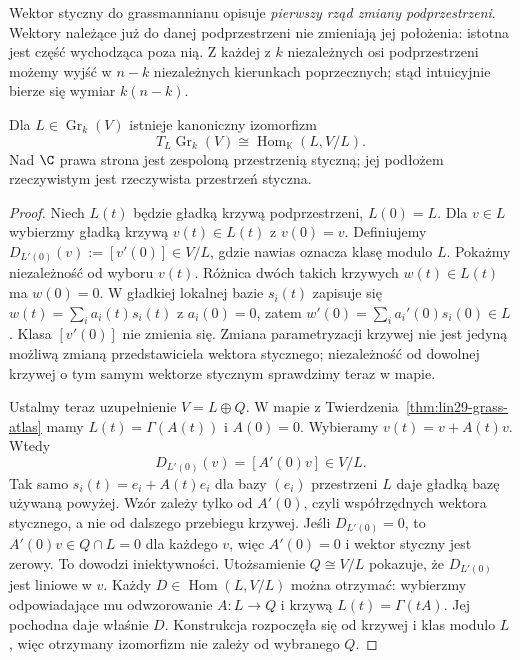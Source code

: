 Wektor styczny do grassmannianu opisuje \emph{pierwszy
rząd zmiany podprzestrzeni}. Wektory należące już do
danej podprzestrzeni nie zmieniają jej położenia:
istotna jest część wychodząca poza nią.
Z każdej z $k$ niezależnych osi podprzestrzeni możemy
wyjść w $n-k$ niezależnych kierunkach poprzecznych;
stąd intuicyjnie bierze się wymiar $k(n-k)$.

\begin{twierdzenie}
\label{thm:lin29-grass-styczna}
Dla $L\in\operatorname{Gr}_k(V)$ istnieje kanoniczny
izomorfizm
\begin{equation}\label{eq:lin29-grass-styczna}
 T_L\operatorname{Gr}_k(V)
  \cong\operatorname{Hom}_{\mathbb K}(L,V/L).
\end{equation}
Nad $\C$ prawa strona jest zespoloną przestrzenią
styczną; jej podłożem rzeczywistym jest rzeczywista
przestrzeń styczna.
\end{twierdzenie}
\begin{proof}
Niech $L(t)$ będzie gładką krzywą podprzestrzeni,
$L(0)=L$. Dla $v\in L$ wybierzmy gładką krzywą
$v(t)\in L(t)$ z $v(0)=v$. Definiujemy
$D_{L'(0)}(v):=[v'(0)]\in V/L$, gdzie nawias oznacza
klasę modulo $L$. Pokażmy niezależność od wyboru
$v(t)$. Różnica dwóch takich krzywych $w(t)\in L(t)$
ma $w(0)=0$. W gładkiej lokalnej bazie $s_i(t)$
zapisuje się $w(t)=\sum_i a_i(t)s_i(t)$ z
$a_i(0)=0$, zatem
$w'(0)=\sum_i a_i'(0)s_i(0)\in L$. Klasa
$[v'(0)]$ nie zmienia się. Zmiana parametryzacji
krzywej nie jest jedyną możliwą zmianą przedstawiciela wektora
stycznego; niezależność od dowolnej krzywej o tym samym wektorze
stycznym sprawdzimy teraz w mapie.

Ustalmy teraz uzupełnienie $V=L\oplus Q$.
W mapie z Twierdzenia~\ref{thm:lin29-grass-atlas} mamy
$L(t)=\Gamma(A(t))$ i $A(0)=0$.
Wybieramy $v(t)=v+A(t)v$. Wtedy
\[
 D_{L'(0)}(v)=[A'(0)v]\in V/L.
\]
Tak samo $s_i(t)=e_i+A(t)e_i$ dla bazy $(e_i)$ przestrzeni $L$
daje gładką bazę używaną powyżej. Wzór zależy tylko od $A'(0)$,
czyli współrzędnych wektora stycznego, a nie od dalszego przebiegu krzywej.
Jeśli $D_{L'(0)}=0$, to $A'(0)v\in Q\cap L=0$ dla każdego $v$,
więc $A'(0)=0$ i wektor styczny jest zerowy. To dowodzi iniektywności.
Utożsamienie $Q\cong V/L$ pokazuje, że
$D_{L'(0)}$ jest liniowe w $v$. Każdy
$D\in\operatorname{Hom}(L,V/L)$ można otrzymać:
wybierzmy odpowiadające mu odwzorowanie $A:L\to Q$
i krzywą $L(t)=\Gamma(tA)$. Jej pochodna daje
właśnie $D$. Konstrukcja rozpoczęła się od
krzywej i klas modulo $L$, więc otrzymany
izomorfizm nie zależy od wybranego $Q$.
\end{proof}

